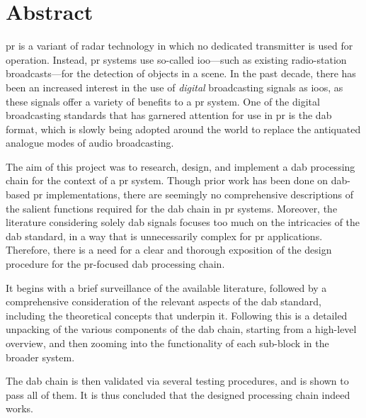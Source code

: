 \documentclass[class=report,11pt,crop=false]{standalone}
\begin{document}
\chapter*{Abstract}

\gls{pr} is a variant of radar technology in which no dedicated transmitter is used for operation. Instead, \gls{pr} systems use so-called \gls{ioo}---such as existing radio-station broadcasts---for the detection of objects in a scene. In the past decade, there has been an increased interest in the use of \emph{digital} broadcasting signals as \gls{ioo}s, as these signals offer a variety of benefits to a \gls{pr} system. One of the digital broadcasting standards that has garnered attention for use in \gls{pr} is the \gls{dab} format, which is slowly being adopted around the world to replace the antiquated analogue modes of audio broadcasting.

The aim of this project was to research, design, and implement a \gls{dab} processing chain for the context of a \gls{pr} system. Though prior work has been done on \gls{dab}-based \gls{pr} implementations, there are seemingly no comprehensive descriptions of the salient functions required for the \gls{dab} chain in \gls{pr} systems. Moreover, the literature considering solely \gls{dab} signals focuses too much on the intricacies of the \gls{dab} standard, in a way that is unnecessarily complex for \gls{pr} applications. Therefore, there is a need for a clear and thorough exposition of the design procedure for the \gls{pr}-focused \gls{dab} processing chain.

It begins with a brief surveillance of the available literature, followed by a comprehensive consideration of the relevant aspects of the \gls{dab} standard, including the theoretical concepts that underpin it. Following this is a detailed unpacking of the various components of the \gls{dab} chain, starting from a high-level overview, and then zooming into the functionality of each sub-block in the broader system.

The \gls{dab} chain is then validated via several testing procedures, and is shown to pass all of them. It is thus concluded that the designed processing chain indeed works.

\ifstandalone

\printnoidxglossary[type=\acronymtype,nonumberlist]
\fi
\end{document}
